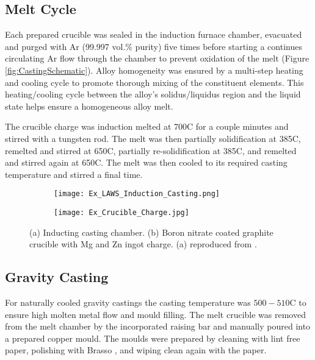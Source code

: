 \documentclass[a4paper,12pt,oneside]{report}%
\begin{document}
\subsection{Melt Cycle}

Each prepared crucible was sealed in the induction furnace chamber, evacuated and purged with Ar (99.997 vol.\% purity) five times before starting a continues circulating Ar flow through the chamber to prevent oxidation of the melt (Figure \ref{fig:CastingSchematic}). Alloy homogeneity was ensured by a multi-step heating and cooling cycle to promote thorough mixing of the constituent elements. This heating/cooling cycle between the alloy's solidus/liquidus region and the liquid state helps ensure a homogeneous alloy melt.

The crucible charge was induction melted at 700\degree C for a couple minutes and stirred with a tungsten rod. The melt was then partially solidification at 385\degree C, remelted and stirred at 650\degree C, partially re-solidification at 385\degree C, and remelted and stirred again at 650\degree C. The melt was then cooled to its required casting temperature and stirred a final time.

\begin{figure}[htbp]
	\centering
	\begin{subfigure}[htbp]{0.49\textwidth}
		\texttt{[image: Ex\_LAWS\_Induction\_Casting.png]}
		\caption{}
		\label{fig:LawsCasting}
	\end{subfigure}
	\begin{subfigure}[htbp]{0.375\textwidth}
		\texttt{[image: Ex\_Crucible\_Charge.jpg]}
		\caption{}
		\label{fig:CrucibleCharge}
	\end{subfigure}
	\caption[(a) Inducting casting chamber. (b) Boron nitrate coated graphite crucible with Mg and Zn ingot charge.]{(a) Inducting casting chamber. (b) Boron nitrate coated graphite crucible with Mg and Zn ingot charge. (a) reproduced from \cite{Laws2007}.}%
	\label{fig:Induction}
\end{figure}

\subsection{Gravity Casting} \label{sec:MasterGravityCasting}

For naturally cooled gravity castings the casting temperature was $500- 510$\degree C to ensure high molten metal flow and mould filling. The melt crucible was removed from the melt chamber by the incorporated raising bar and manually poured into a prepared copper mould. The moulds were prepared by cleaning with lint free paper, polishing with Brasso \textcopyright, and wiping clean again with the paper. 
\end{document}
